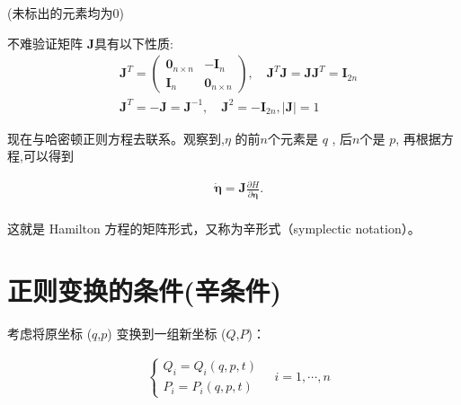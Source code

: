 \documentclass[12pt]{ctexart}
\begin{document}
    (未标出的元素均为0)

    不难验证矩阵 $\boldsymbol{J} $具有以下性质:
    \begin{equation}
        \begin{aligned}
    &\boldsymbol{J}^T = \begin{pmatrix}
    \boldsymbol{0}_{n\times n} & -\boldsymbol{I}_n \\
    \boldsymbol{I}_n & \boldsymbol{0}_{n\times n}
    \end{pmatrix},\quad \boldsymbol{J}^T\boldsymbol{J} = \boldsymbol{J}\boldsymbol{J}^T = \boldsymbol{I}_{2n} \\
    &\boldsymbol{J}^T = -\boldsymbol{J} = \boldsymbol{J}^{-1},\quad \boldsymbol{J}^2 = -\boldsymbol{I}_{2n}, |\boldsymbol{J}| = 1
    \end{aligned}
    \label{eq:5}
    \end{equation}
 
       现在与哈密顿正则方程去联系。观察到,$\eta$ 的前$n$个元素是 $q$ , 后$n$个是 $p $, 再根据方程,可以得到

        \begin{equation}
            \begin{aligned}
        &\boxed{\dot{\boldsymbol{\eta}} = \boldsymbol{J} \frac{\partial H}{\partial \boldsymbol{\eta}}.} \\
    \end{aligned}
    \label{eq:6}
\end{equation}

       这就是 Hamilton 方程的矩阵形式，又称为辛形式（symplectic notation）。


















\section{正则变换的条件(辛条件)}

考虑将原坐标 ($q$,$p$) 变换到一组新坐标 ($Q$,$P$)：

\begin{equation}
\begin{aligned}
&\left\{\begin{array}{ll}Q_i=Q_i(q,p,t)\\P_i=P_i(q,p,t)\end{array}\right.\quad i=1,\cdots,n \\
\end{aligned}
\label{eq:7}
\end{equation}
\end{document}
